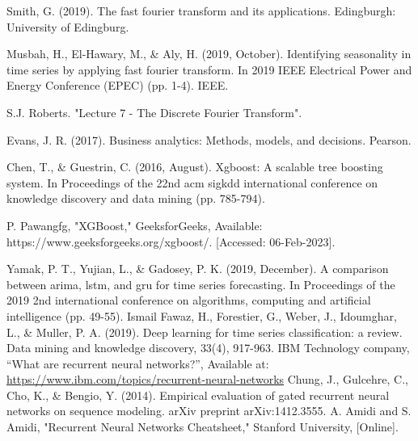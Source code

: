 \documentclass{ieeeojies}
\begin{document}
\begin{thebibliography}{00}
Smith, G. (2019). The fast fourier transform and its applications. Edingburgh: University of Edingburg.




Musbah, H., El-Hawary, M., \& Aly, H. (2019, October). Identifying seasonality in time series by applying fast fourier transform. In 2019 IEEE Electrical Power and Energy Conference (EPEC) (pp. 1-4). IEEE.

S.J. Roberts. "Lecture 7 - The Discrete Fourier Transform".

Evans, J. R. (2017). Business analytics: Methods, models, and decisions. Pearson.

Chen, T., \& Guestrin, C. (2016, August). Xgboost: A scalable tree boosting system. In Proceedings of the 22nd acm sigkdd international conference on knowledge discovery and data mining (pp. 785-794).

P. Pawangfg, "XGBoost," GeeksforGeeks, Available: https://www.geeksforgeeks.org/xgboost/. [Accessed: 06-Feb-2023].

Yamak, P. T., Yujian, L., \& Gadosey, P. K. (2019, December). A comparison between arima, lstm, and gru for time series forecasting. In Proceedings of the 2019 2nd international conference on algorithms, computing and artificial intelligence (pp. 49-55).
Ismail Fawaz, H., Forestier, G., Weber, J., Idoumghar, L., \& Muller, P. A. (2019). Deep learning for time series classification: a review. Data mining and knowledge discovery, 33(4), 917-963.
IBM Technology company, “What are recurrent neural networks?”, Available at: \url{https://www.ibm.com/topics/recurrent-neural-networks}
Chung, J., Gulcehre, C., Cho, K., \& Bengio, Y. (2014). Empirical evaluation of gated recurrent neural networks on sequence modeling. arXiv preprint arXiv:1412.3555.
A. Amidi and S. Amidi, "Recurrent Neural Networks Cheatsheet," Stanford University, [Online].



\end{thebibliography}






\EOD
\end{document}
